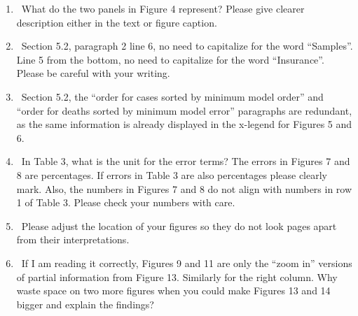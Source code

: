 \documentclass[12pt]{article}
\theoremstyle{definition}
\renewcommand{\_}{%
    \textunderscore\hspace{0pt}%
}
\newcommand{\DOIT}{{\color{red!60!black}\makebox[0pt][l]{$\square$}\raisebox{.15ex}{\hspace{0.1em}$\boxtimes}}~}
\begin{document}
\begin{enumerate}
\item \DOIT What do the two panels in Figure 4 represent? Please give clearer description either in the text or figure caption.

    \begin{quote}
    \end{quote}

\item \DOIT Section 5.2, paragraph 2 line 6, no need to capitalize for the word “Samples”. Line 5 from the bottom, no need to capitalize for the word “Insurance”. Please be careful with your writing.

    \begin{quote}
    \end{quote}

\item \DOIT Section 5.2, the “order for cases sorted by minimum model order” and “order for deaths sorted by minimum model error” paragraphs are redundant, as the same information is already displayed in the x-legend for Figures 5 and 6.

    \begin{quote}
    \end{quote}

\item \DOIT In Table 3, what is the unit for the error terms? The errors in Figures 7 and 8 are percentages. If errors in Table 3 are also percentages please clearly mark. Also, the numbers in Figures 7 and 8 do not align with numbers in row 1 of Table 3. Please check your numbers with care.

    \begin{quote}
    \end{quote}

\item \DOIT Please adjust the location of your figures so they do not look pages apart from their interpretations.

    \begin{quote}
    \end{quote}

\item \DOIT If I am reading it correctly, Figures 9 and 11 are only the “zoom in” versions of partial information from Figure 13. Similarly for the right column. Why waste space on two more figures when you could make Figures 13 and 14 bigger and explain the findings?


\end{enumerate}
\end{document}
